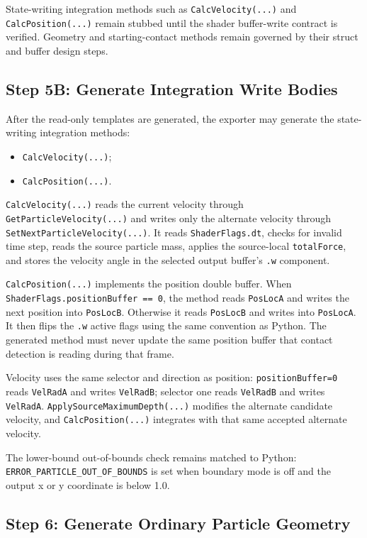 State-writing integration methods such as \texttt{CalcVelocity(...)} and
\texttt{CalcPosition(...)} remain stubbed until the shader buffer-write
contract is verified.  Geometry and starting-contact methods remain governed
by their struct and buffer design steps.

\subsection{Step 5B: Generate Integration Write Bodies}

After the read-only templates are generated, the exporter may generate the
state-writing integration methods:
\begin{itemize}
    \item \texttt{CalcVelocity(...)};
    \item \texttt{CalcPosition(...)}.
\end{itemize}

\texttt{CalcVelocity(...)} reads the current velocity through
\texttt{GetParticleVelocity(...)} and writes only the alternate velocity
through \texttt{SetNextParticleVelocity(...)}.  It reads
\texttt{ShaderFlags.dt}, checks for invalid time step, reads the source
particle mass, applies the source-local \texttt{totalForce}, and stores the
velocity angle in the selected output buffer's \texttt{.w} component.

\texttt{CalcPosition(...)} implements the position double buffer.  When
\texttt{ShaderFlags.positionBuffer == 0}, the method reads \texttt{PosLocA}
and writes the next position into \texttt{PosLocB}.  Otherwise it reads
\texttt{PosLocB} and writes into \texttt{PosLocA}.  It then flips the
\texttt{.w} active flags using the same convention as Python.  The generated
method must never update the same position buffer that contact detection is
reading during that frame.

Velocity uses the same selector and direction as position:
\texttt{positionBuffer=0} reads \texttt{VelRadA} and writes
\texttt{VelRadB}; selector one reads \texttt{VelRadB} and writes
\texttt{VelRadA}.  \texttt{ApplySourceMaximumDepth(...)} modifies the alternate
candidate velocity, and \texttt{CalcPosition(...)} integrates with that same
accepted alternate velocity.

The lower-bound out-of-bounds check remains matched to Python:
\texttt{ERROR\_PARTICLE\_OUT\_OF\_BOUNDS} is set when boundary mode is off and
the output x or y coordinate is below 1.0.

\subsection{Step 6: Generate Ordinary Particle Geometry}

